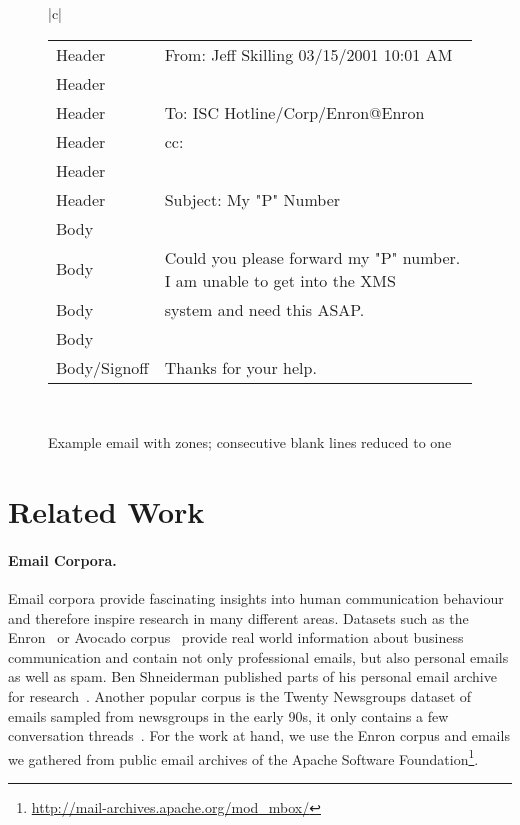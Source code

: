 \documentclass{llncs}
\begin{document}
\begin{figure}
\begin{tabular}{|c|}
{\begin{tabular*}{\textwidth}{l|l}
		Header         & From:  Jeff Skilling                           03/15/2001 10:01 AM \\
		Header         & \\
		Header         & To: ISC Hotline/Corp/Enron@Enron\\
		Header         & cc:\\
		Header         & \\
		Header         & Subject: My "P" Number\\\hline
		Body           & \\
		Body           & Could you please forward my "P" number.  I am unable to get into the XMS \\
		Body           & system and need this ASAP.\\
		Body           & \\
		Body/Signoff   & Thanks for your help.\\
	\end{tabular*}
}
	\\ 
	\hline 
\end{tabular} 
\caption{Example email with zones; consecutive blank lines reduced to one}
\label{fig:examplemail}
\end{figure}





\section{Related Work}
\paragraph{Email Corpora.}
Email corpora provide fascinating insights into human communication behaviour and therefore inspire research in many different areas.
Datasets such as the Enron~\cite{enron} or Avocado corpus~\cite{avocado} provide real world information about business communication and contain not only professional emails, but also personal emails as well as spam.
Ben Shneiderman published parts of his personal email archive for research~\cite{shneiderman}.
Another popular corpus is the Twenty Newsgroups dataset of emails sampled from newsgroups in the early 90s, it only contains a few conversation threads~\cite{20news}.
For the work at hand, we use the Enron corpus and emails we gathered from public email archives of the Apache Software Foundation\footnote{\url{http://mail-archives.apache.org/mod\_mbox/}}.
\end{document}
